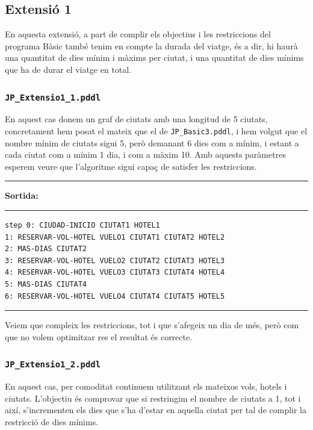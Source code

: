 \documentclass[11pt,a4paper]{article}
\begin{document}
\subsection{Extensió 1}

En aquesta extensió, a part de complir els objectius i les restriccions del programa Bàsic també tenim en compte la durada del viatge, és a dir, hi haurà una quantitat de dies mínim i màxims per ciutat, i una quantitat de dies mínims que ha de durar el viatge en total.

\subsubsection*{\texttt{JP\_Extensio1\_1.pddl}}

En aquest cas donem un graf de ciutats amb una longitud de 5 ciutats, concretament hem posat el mateix que el de \texttt{JP\_Basic3.pddl}, i hem volgut que el nombre mínim de ciutats sigui 5, però demanant 6 dies com a mínim, i estant a cada ciutat com a mínim 1 dia, i com a màxim 10. Amb aquests paràmetres esperem veure que l'algoritme sigui capaç de satisfer les restriccions. 

\begin{samepage}
\medskip
\noindent
\rule{0.1\textwidth}{0.5mm}
\textbf{Sortida:}
\rule{0.76\textwidth}{0.5mm}
\begin{verbatim}
step 0: CIUDAD-INICIO CIUTAT1 HOTEL1
1: RESERVAR-VOL-HOTEL VUELO1 CIUTAT1 CIUTAT2 HOTEL2
2: MAS-DIAS CIUTAT2
3: RESERVAR-VOL-HOTEL VUELO2 CIUTAT2 CIUTAT3 HOTEL3
4: RESERVAR-VOL-HOTEL VUELO3 CIUTAT3 CIUTAT4 HOTEL4
5: MAS-DIAS CIUTAT4
6: RESERVAR-VOL-HOTEL VUELO4 CIUTAT4 CIUTAT5 HOTEL5
\end{verbatim}
\rule{\textwidth}{0.5mm}
\medskip
\end{samepage}

Veiem que compleix les restriccions, tot i que s'afegeix un dia de més, però com que no volem optimitzar res el resultat és correcte.

\subsubsection*{\texttt{JP\_Extensio1\_2.pddl}}

En aquest cas, per comoditat continuem utilitzant els mateixos vols, hotels i ciutats. L'objectiu és comprovar que si restringim el nombre de ciutats a 1, tot i així, s'incrementen els dies que s'ha d'estar en aquella ciutat per tal de complir la restricció de dies mínims.
\end{document}
